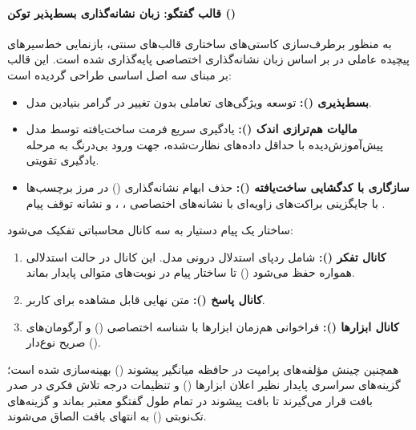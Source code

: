 \paragraph*{قالب گفتگو: زبان نشانه‌گذاری بسط‌پذیر توکن ()}
به منظور برطرف‌سازی کاستی‌های ساختاری قالب‌های سنتی، بازنمایی خط‌سیرهای پیچیده عاملی در  بر اساس زبان نشانه‌گذاری اختصاصی  پایه‌گذاری شده است. این قالب بر مبنای سه اصل اساسی طراحی گردیده است:
\begin{itemize}
    \item \textbf{بسط‌پذیری ():} توسعه ویژگی‌های تعاملی بدون تغییر در گرامر بنیادین مدل.
    \item \textbf{مالیات هم‌ترازی اندک ():} یادگیری سریع فرمت ساخت‌یافته توسط مدل پیش‌آموزش‌دیده با حداقل داده‌های نظارت‌شده، جهت ورود بی‌درنگ به مرحله یادگیری تقویتی.
    \item \textbf{سازگاری با کدگشایی ساخت‌یافته ():} حذف ابهام نشانه‌گذاری () در مرز برچسب‌ها با جایگزینی براکت‌های زاویه‌ای با نشانه‌های اختصاصی \en{[open]}، \en{[sep]}، \en{[close]} و نشانه توقف پیام .
\end{itemize}

ساختار یک پیام دستیار به سه کانال محاسباتی تفکیک می‌شود:
\begin{enumerate}
    \item \textbf{کانال تفکر ():} شامل ردپای استدلال درونی مدل. این کانال در حالت استدلالی همواره حفظ می‌شود () تا ساختار پیام در نوبت‌های متوالی پایدار بماند.
    \item \textbf{کانال پاسخ ():} متن نهایی قابل مشاهده برای کاربر.
    \item \textbf{کانال ابزارها ():} فراخوانی هم‌زمان ابزارها با شناسه اختصاصی () و آرگومان‌های صریح نوع‌دار ().
\end{enumerate}

همچنین چینش مؤلفه‌های پرامپت در حافظه میانگیر پیشوند () بهینه‌سازی شده است؛ گزینه‌های سراسری پایدار نظیر اعلان ابزارها () و تنظیمات درجه تلاش فکری در صدر بافت قرار می‌گیرند تا بافت پیشوند در تمام طول گفتگو معتبر بماند و گزینه‌های تک‌نوبتی () به انتهای بافت الصاق می‌شوند.

